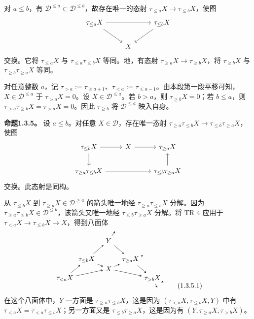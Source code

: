 对 $a\leq b$，有 $\mathcal D^{\leq a}\subset\mathcal D^{\leq b}$，故存在唯一的态射 $\tau_{\leq a}X\to\tau_{\leq b}X$，使图
\[
\begin{tikzcd}[ampersand replacement=\&]
\tau_{\leq a}X\arrow[rr]\arrow[dr]\&\&\tau_{\leq b}X\arrow[dl]\\
\&X\&
\end{tikzcd}
\]
交换。它将 $\tau_{\leq a}X$ 与 $\tau_{\leq a}\tau_{\leq b}X$ 等同。地，有态射 $\tau_{\geq a}X\to\tau_{\geq b}X$，将 $\tau_{\geq b}X$ 与 $\tau_{\geq b}\tau_{\geq a}X$ 等同。

对任意整数 $a$，记 $\tau_{>a}:=\tau_{\geq a+1}$、$\tau_{<a}:=\tau_{\leq a-1}$。由本段第一段平移可知，$X\in\mathcal D^{\leq a}$ 于 $\tau_{>a}X=0$。设 $X\in\mathcal D^{\leq a}$。若 $b>a$，则 $\tau_{\geq b}X=0$；若 $b\leq a$，则 $\tau_{>a}\tau_{\geq b}X=\tau_{>a}X=0$。因此 $\tau_{\geq b}$ 将 $\mathcal D^{\leq a}$ 映入自身。

\par\medskip\noindent\textbf{命题1.3.5。} 设 $a\leq b$。对任意 $X\in\mathcal D$，存在唯一态射 $\tau_{\geq a}\tau_{\leq b}X\to\tau_{\leq b}\tau_{\geq a}X$，使图
\[
\begin{tikzcd}[ampersand replacement=\&]
 \tau_{\leq b}X\arrow[r]\arrow[d]\&X\arrow[r]\&\tau_{\geq a}X\\
 \tau_{\geq a}\tau_{\leq b}X\arrow[rr]\&\&\tau_{\leq b}\tau_{\geq a}X\arrow[u]
\end{tikzcd}
\]
交换。此态射是同构。

从 $\tau_{\leq b}X$ 到 $\tau_{\geq a}X\in\mathcal D^{\geq a}$ 的箭头唯一地经 $\tau_{\geq a}\tau_{\leq b}X$ 分解。因为 $\tau_{\geq a}\tau_{\leq b}X\in\mathcal D^{\leq b}$，该箭头又唯一地经 $\tau_{\leq b}\tau_{\geq a}X$ 分解。将 TR 4 应用于 $\tau_{<a}X\to\tau_{\leq b}X\to X$，得到八面体
\begin{equation*}
\begin{tikzpicture}[>=stealth,scale=.8]
\node(a)at(0,0){$\tau_{<a}X$};\node(b)at(1.4,1.2){$\tau_{\leq b}X$};\node(c)at(2.8,2.4){$Y$};\node(d)at(2.8,.6){$X$};\node(e)at(4.2,1.2){$\tau_{\geq a}X$};\node(f)at(5.6,0){$\tau_{>b}X$};
\draw[->](a)--(b);\draw[->](b)--(c);\draw[->](c)--(e);\draw[->](e)--(f);\draw[->](a)--(d);\draw[->](b)--(d);\draw[->](d)--(e);\draw[->](d)--(f);\draw[->](c)--++(.4,.6);\draw[->](e)--++(.8,.25);\draw[->](f)--++(.7,-.25);\draw[->](f)--++(.3,-.6);
\end{tikzpicture}\tag{1.3.5.1}
\end{equation*}
在这个八面体中，$Y$ 一方面是 $\tau_{\geq a}\tau_{\leq b}X$，这是因为 $(\tau_{<a}X,\tau_{\leq b}X,Y)$ 中有 $\tau_{<a}X=\tau_{<a}\tau_{\leq b}X$；另一方面又是 $\tau_{\leq b}\tau_{\geq a}X$，这是因为有 $(Y,\tau_{\geq a}X,\tau_{>b}X)$。

